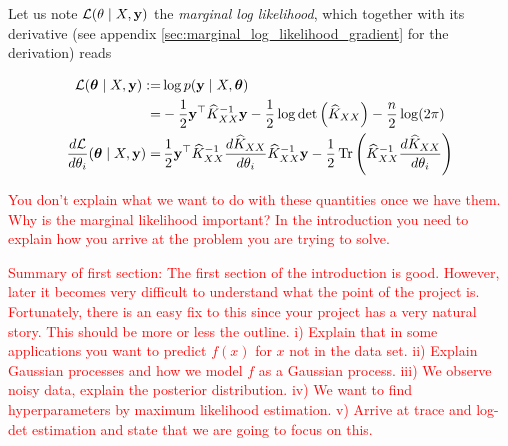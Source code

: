 \documentclass{article}
\begin{document}
{%
Let us note $\mathcal L(\theta \mid X, \boldsymbol{\mathbf{y}})$ the \emph{marginal log likelihood}, which together with its derivative (see appendix \ref{sec:marginal_log_likelihood_gradient} for the derivation) reads

\begin{align}
    \mathcal L(\boldsymbol{\mathbf{\theta}} \mid X, \boldsymbol{\mathbf{y}}) 
    :=& \log p(\boldsymbol{\mathbf{y}} \mid X, \boldsymbol{\mathbf{\theta}}) \nonumber\\
    =& - \frac 1 2 \boldsymbol{\mathbf{y}}^\top \widehat K_{XX}^{-1} \boldsymbol{\mathbf{y}} - \frac 1 2 \log \det \left( \widehat K_{XX} \right) - \frac n 2 \log(2\pi) \label{eq:marginal_log_likelihood}\\
    \frac{d \mathcal L}{d \theta_i} (\boldsymbol{\mathbf{\theta}} \mid X, \boldsymbol{\mathbf{y}}) 
    =& \, \frac 1 2 \boldsymbol{\mathbf{y}}^\top \widehat K_{XX}^{-1} \frac{d \widehat K_{XX}}{d\theta_i} \widehat K_{XX}^{-1} \boldsymbol{\mathbf{y}} - \frac 1 2 \operatorname{Tr} \left( \widehat K_{XX}^{-1} \frac{d \widehat K_{XX}}{d\theta_i} \right) \label{eq:marginal_log_likelihood_gradient}
\end{align}




\textcolor{red}{You don't explain what we want to do with these quantities once we have them. Why is the marginal likelihood important? In the introduction you need to explain how you arrive at the problem you are trying to solve. }

\textcolor{red}{Summary of first section: The first section of the introduction is good. However, later it becomes very difficult to understand what the point of the project is. Fortunately, there is an easy fix to this since your project has a very natural story. This should be more or less the outline. i) Explain that in some applications you want to predict $f(x)$ for $x$ not in the data set. ii) Explain Gaussian processes and how we model $f$ as a Gaussian process. iii) We observe noisy data, explain the posterior distribution. iv) We want to find hyperparameters by maximum likelihood estimation. v) Arrive at trace and log-det estimation and state that we are going to focus on this.}

}
\end{document}
